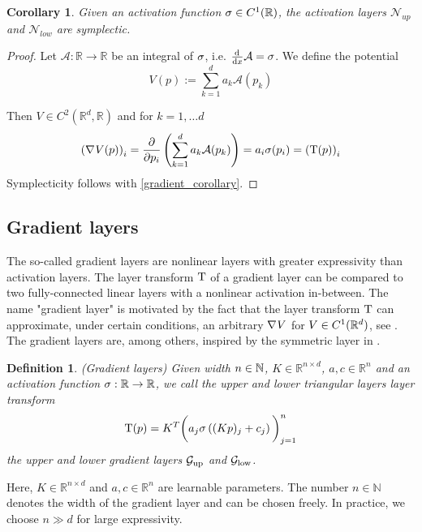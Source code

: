 \documentclass[twoside,a4paper]{article}
\newtheorem{definition}{Definition}
\newtheorem{corollary}{Corollary}
\begin{document}
\begin{corollary}
	Given an activation function $\sigma \in C^1(\mathbb{R})$,
	the activation layers $\mathcal{N}_{up}$ and $\mathcal{N}_{low}$ are symplectic.
\end{corollary}
\begin{proof}
	Let $\mathcal{A}: \mathbb{R} \to \mathbb{R}$ be an integral of $\sigma$, 
	i.e. $\frac{\mathrm{d}^{}}{\mathrm{d}x} \mathcal{A} = \sigma$. We define the potential
	\begin{equation*}
		V(p) := \sum_{k=1}^d a_k \mathcal{A}(p_k)
	\end{equation*}

	Then $V \in C^2(\mathbb{R}^d, \mathbb{R})$ and for $k=1, \dots d$
	\begin{equation*}
		\left( \nabla_{}{V}(p) \right)_i = \frac{\partial }{\partial p_i} \left( \sum_{k=1}^d a_k \mathcal{A}(p_k) \right)
		= a_i \sigma(p_i) = \left( \mathrm{T}(p) \right)_i
	\end{equation*}
	Symplecticity follows with \cref{gradient_corollary}.
\end{proof}

\subsection{Gradient layers}

The so-called gradient layers are nonlinear layers with
greater expressivity than activation layers. The layer transform $\mathrm{T}$
of a gradient layer can be compared to two fully-connected linear layers with a
nonlinear activation in-between. The name "gradient layer" is
motivated by the fact that the layer transform $\mathrm{T}$ can approximate,
under certain conditions, an arbitrary $\nabla_{}{V}$ for $V \in C^1(\mathbb{R}^d)$, 
see \citet[Lemma 4]{Jin2020}. The gradient layers are, among others, inspired
by the symmetric layer in \citet{Ruthotto2020}.

\begin{definition}
	(Gradient layers)
	Given width $n \in \mathbb{N}$, $K \in \mathbb{R}^{n \times d}$, $a,c \in \mathbb{R}^n$ and
	an activation function $\sigma : \mathbb{R} \to \mathbb{R}$,
	we call the upper and lower triangular layers layer transform
	\begin{equation*}
		\mathrm{T}(p) = K^T \bigg( a_j \sigma \left( (Kp)_j + c_j \right) \bigg)_{j=1}^n
	\end{equation*}
	the upper and lower gradient layers $\mathcal{G}_{\text{up}}$ and $\mathcal{G}_{\text{low}}$.
\end{definition}
Here, $K \in \mathbb{R}^{n \times d}$ and $a,c \in \mathbb{R}^n$
are learnable parameters. 
The number $n \in \mathbb{N}$ denotes the width of the gradient layer and can be chosen freely.
In practice, we choose $n \gg d$ for large expressivity.
\end{document}
